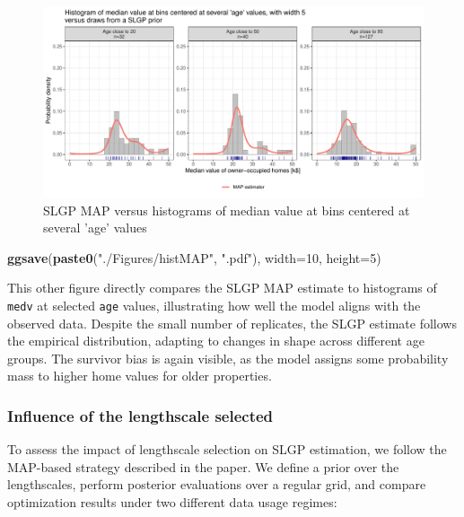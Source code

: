 \documentclass[
]{article}
\newenvironment{Shaded}{\begin{snugshade}}{\end{snugshade}}
\newcommand{\AttributeTok}[1]{\textcolor[rgb]{0.13,0.29,0.53}{#1}}
\newcommand{\DecValTok}[1]{\textcolor[rgb]{0.00,0.00,0.81}{#1}}
\newcommand{\FunctionTok}[1]{\textcolor[rgb]{0.13,0.29,0.53}{\textbf{#1}}}
\newcommand{\NormalTok}[1]{#1}
\newcommand{\StringTok}[1]{\textcolor[rgb]{0.31,0.60,0.02}{#1}}
\begin{document}
\begin{figure}[H]

{\centering \includegraphics{IntroductionSLGP_files/figure-latex/SLGPplottingMAP-1} 

}

\caption{SLGP MAP versus histograms of median value at bins centered at several 'age' values}\label{fig:SLGPplottingMAP}
\end{figure}

\begin{Shaded}
\begin{Highlighting}[]

\FunctionTok{ggsave}\NormalTok{(}\FunctionTok{paste0}\NormalTok{(}\StringTok{"./Figures/histMAP"}\NormalTok{,  }\StringTok{".pdf"}\NormalTok{), }\AttributeTok{width=}\DecValTok{10}\NormalTok{, }\AttributeTok{height=}\DecValTok{5}\NormalTok{)}
\end{Highlighting}
\end{Shaded}

This other figure directly compares the SLGP MAP estimate to histograms of \texttt{medv} at selected \texttt{age} values, illustrating how well the model aligns with the observed data. Despite the small number of replicates, the SLGP estimate follows the empirical distribution, adapting to changes in shape across different age groups. The survivor bias is again visible, as the model assigns some probability mass to higher home values for older properties.

\subsubsection{Influence of the lengthscale selected}\label{influence-of-the-lengthscale-selected}

To assess the impact of lengthscale selection on SLGP estimation, we follow the MAP-based strategy described in the paper. We define a prior over the lengthscales, perform posterior evaluations over a regular grid, and compare optimization results under two different data usage regimes:
\end{document}
